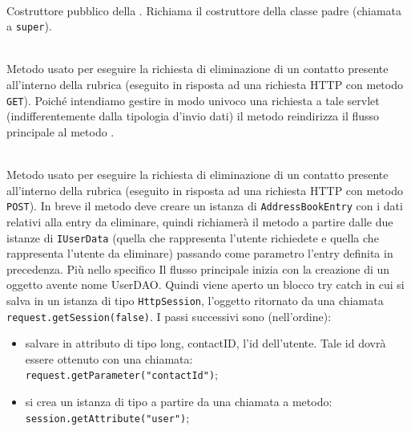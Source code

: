 \begin{description}
	\item{}\\
	Costruttore pubblico della . Richiama il costruttore della classe padre (chiamata a \texttt{super}).
	
	\item{}\\
	Metodo usato per eseguire la richiesta di eliminazione di un contatto presente all'interno della rubrica (eseguito in risposta ad una richiesta HTTP con metodo \texttt{GET}). Poiché intendiamo gestire in modo univoco una richiesta a tale servlet (indifferentemente dalla tipologia d'invio dati) il metodo reindirizza il flusso principale al metodo .
	
	\item{}\\	
	Metodo usato per eseguire la richiesta di eliminazione di un contatto presente all'interno della rubrica (eseguito in risposta ad una richiesta HTTP con metodo \texttt{POST}). In breve il metodo deve creare un istanza di \texttt{AddressBookEntry} con i dati relativi alla entry da eliminare, quindi richiamerà il metodo  a partire dalle due istanze di \texttt{IUserData} (quella che rappresenta l'utente richiedete e quella che rappresenta l'utente da eliminare) passando come parametro l'entry definita in precedenza. Più nello specifico Il flusso principale inizia  con la creazione di un oggetto  avente nome UserDAO. Quindi viene aperto un blocco try catch in cui si salva in un istanza di tipo \texttt{HttpSession}, l'oggetto ritornato da una chiamata \verb|request.getSession(false)|. I passi successivi sono (nell'ordine):
	\begin{itemize}
		\item salvare in attributo di tipo long, contactID, l'id dell'utente. Tale id dovrà essere ottenuto con una chiamata:\\
		\verb|request.getParameter("contactId")|;\\
		
		\item si crea un istanza di tipo  a partire da una chiamata a metodo:\\
		\verb|session.getAttribute("user")|;
		

\end{itemize}
\end{description}
